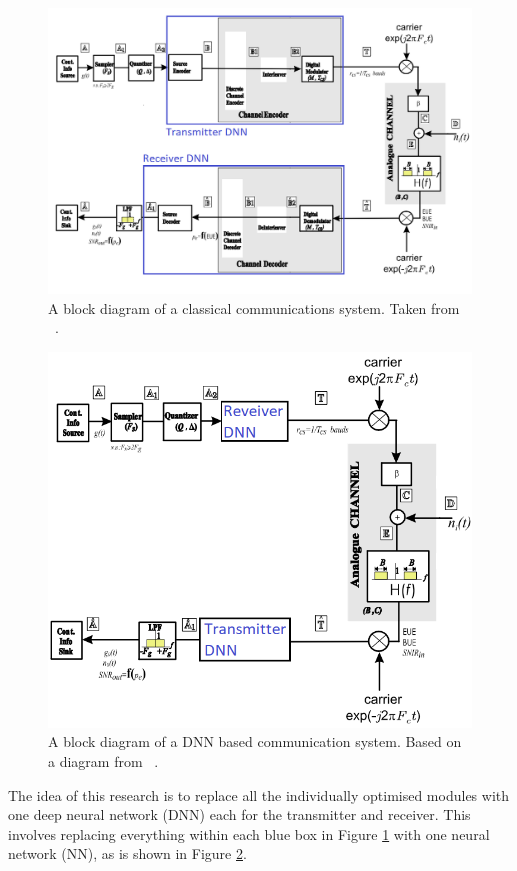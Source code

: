 \documentclass[12pt,onecolumn,letterpaper]{article}
\begin{document}
\begin{figure}[t]
\begin{center}
   \includegraphics[width=0.8\linewidth]{figures/classical_comms_block_diagram.png}
\end{center}
   \caption{A block diagram of a classical communications system. Taken from ~\cite{EE3CommsSystemsNotesL4}.}
\label{fig:ClassicalCommsBlockDiagram}
\end{figure}

\begin{figure}[t]
\begin{center}
   \includegraphics[width=0.8\linewidth]{figures/dnn_block_diagram.png}
\end{center}
   \caption{A block diagram of a DNN based communication system. Based on a diagram from ~\cite{EE3CommsSystemsNotesL4}.}
\label{fig:DNNCommsBlockDiagram}
\end{figure}

The idea of this research is to replace all the individually optimised modules with one deep neural network (DNN) each for the transmitter and receiver. This involves replacing everything within each blue box in Figure \ref{fig:ClassicalCommsBlockDiagram} with one neural network (NN), as is shown in Figure \ref{fig:DNNCommsBlockDiagram}. 
\end{document}

